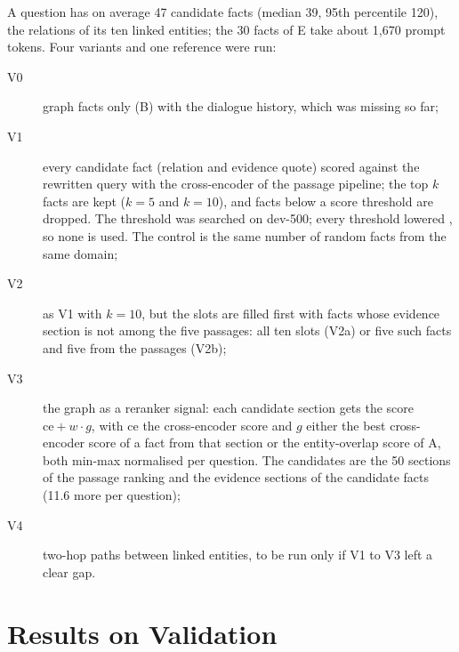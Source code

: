 A question has on average 47 candidate facts (median 39, 95th percentile 120), the
relations of its ten linked entities; the 30 facts of E take about 1{,}670 prompt tokens.
Four variants and one reference were run:
\begin{description}
    \item[V0] graph facts only (B) with the dialogue history, which was missing so far;
    \item[V1] every candidate fact (relation and evidence quote) scored against the
        rewritten query with the cross-encoder of the passage pipeline; the top $k$ facts
        are kept ($k = 5$ and $k = 10$), and facts below a score threshold are dropped. The
        threshold was searched on dev-500; every threshold lowered \fone{}, so none is used.
        The control is the same number of random facts from the same domain;
    \item[V2] as V1 with $k = 10$, but the slots are filled first with facts whose evidence
        section is not among the five passages: all ten slots (V2a) or five such facts and
        five from the passages (V2b);
    \item[V3] the graph as a reranker signal: each candidate section gets the score
        $\mathrm{ce} + w \cdot g$, with ce the cross-encoder score and $g$ either the best
        cross-encoder score of a fact from that section or the entity-overlap score of A,
        both min-max normalised per question. The candidates are the 50 sections of the
        passage ranking and the evidence sections of the candidate facts (11.6 more per
        question);
    \item[V4] two-hop paths between linked entities, to be run only if V1 to V3 left a
        clear gap.
\end{description}


\section{Results on Validation}\label{sec:graphrag:val}

